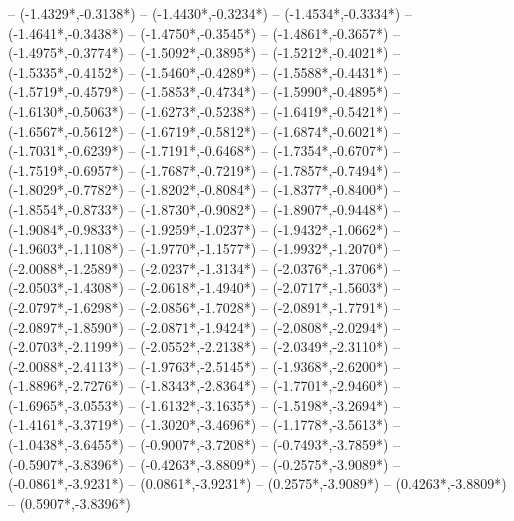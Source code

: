 {	-- ({-1.4329*\dx},{-0.3138*\dy})
	-- ({-1.4430*\dx},{-0.3234*\dy})
	-- ({-1.4534*\dx},{-0.3334*\dy})
	-- ({-1.4641*\dx},{-0.3438*\dy})
	-- ({-1.4750*\dx},{-0.3545*\dy})
	-- ({-1.4861*\dx},{-0.3657*\dy})
	-- ({-1.4975*\dx},{-0.3774*\dy})
	-- ({-1.5092*\dx},{-0.3895*\dy})
	-- ({-1.5212*\dx},{-0.4021*\dy})
	-- ({-1.5335*\dx},{-0.4152*\dy})
	-- ({-1.5460*\dx},{-0.4289*\dy})
	-- ({-1.5588*\dx},{-0.4431*\dy})
	-- ({-1.5719*\dx},{-0.4579*\dy})
	-- ({-1.5853*\dx},{-0.4734*\dy})
	-- ({-1.5990*\dx},{-0.4895*\dy})
	-- ({-1.6130*\dx},{-0.5063*\dy})
	-- ({-1.6273*\dx},{-0.5238*\dy})
	-- ({-1.6419*\dx},{-0.5421*\dy})
	-- ({-1.6567*\dx},{-0.5612*\dy})
	-- ({-1.6719*\dx},{-0.5812*\dy})
	-- ({-1.6874*\dx},{-0.6021*\dy})
	-- ({-1.7031*\dx},{-0.6239*\dy})
	-- ({-1.7191*\dx},{-0.6468*\dy})
	-- ({-1.7354*\dx},{-0.6707*\dy})
	-- ({-1.7519*\dx},{-0.6957*\dy})
	-- ({-1.7687*\dx},{-0.7219*\dy})
	-- ({-1.7857*\dx},{-0.7494*\dy})
	-- ({-1.8029*\dx},{-0.7782*\dy})
	-- ({-1.8202*\dx},{-0.8084*\dy})
	-- ({-1.8377*\dx},{-0.8400*\dy})
	-- ({-1.8554*\dx},{-0.8733*\dy})
	-- ({-1.8730*\dx},{-0.9082*\dy})
	-- ({-1.8907*\dx},{-0.9448*\dy})
	-- ({-1.9084*\dx},{-0.9833*\dy})
	-- ({-1.9259*\dx},{-1.0237*\dy})
	-- ({-1.9432*\dx},{-1.0662*\dy})
	-- ({-1.9603*\dx},{-1.1108*\dy})
	-- ({-1.9770*\dx},{-1.1577*\dy})
	-- ({-1.9932*\dx},{-1.2070*\dy})
	-- ({-2.0088*\dx},{-1.2589*\dy})
	-- ({-2.0237*\dx},{-1.3134*\dy})
	-- ({-2.0376*\dx},{-1.3706*\dy})
	-- ({-2.0503*\dx},{-1.4308*\dy})
	-- ({-2.0618*\dx},{-1.4940*\dy})
	-- ({-2.0717*\dx},{-1.5603*\dy})
	-- ({-2.0797*\dx},{-1.6298*\dy})
	-- ({-2.0856*\dx},{-1.7028*\dy})
	-- ({-2.0891*\dx},{-1.7791*\dy})
	-- ({-2.0897*\dx},{-1.8590*\dy})
	-- ({-2.0871*\dx},{-1.9424*\dy})
	-- ({-2.0808*\dx},{-2.0294*\dy})
	-- ({-2.0703*\dx},{-2.1199*\dy})
	-- ({-2.0552*\dx},{-2.2138*\dy})
	-- ({-2.0349*\dx},{-2.3110*\dy})
	-- ({-2.0088*\dx},{-2.4113*\dy})
	-- ({-1.9763*\dx},{-2.5145*\dy})
	-- ({-1.9368*\dx},{-2.6200*\dy})
	-- ({-1.8896*\dx},{-2.7276*\dy})
	-- ({-1.8343*\dx},{-2.8364*\dy})
	-- ({-1.7701*\dx},{-2.9460*\dy})
	-- ({-1.6965*\dx},{-3.0553*\dy})
	-- ({-1.6132*\dx},{-3.1635*\dy})
	-- ({-1.5198*\dx},{-3.2694*\dy})
	-- ({-1.4161*\dx},{-3.3719*\dy})
	-- ({-1.3020*\dx},{-3.4696*\dy})
	-- ({-1.1778*\dx},{-3.5613*\dy})
	-- ({-1.0438*\dx},{-3.6455*\dy})
	-- ({-0.9007*\dx},{-3.7208*\dy})
	-- ({-0.7493*\dx},{-3.7859*\dy})
	-- ({-0.5907*\dx},{-3.8396*\dy})
	-- ({-0.4263*\dx},{-3.8809*\dy})
	-- ({-0.2575*\dx},{-3.9089*\dy})
	-- ({-0.0861*\dx},{-3.9231*\dy})
	-- ({0.0861*\dx},{-3.9231*\dy})
	-- ({0.2575*\dx},{-3.9089*\dy})
	-- ({0.4263*\dx},{-3.8809*\dy})
	-- ({0.5907*\dx},{-3.8396*\dy})
}
